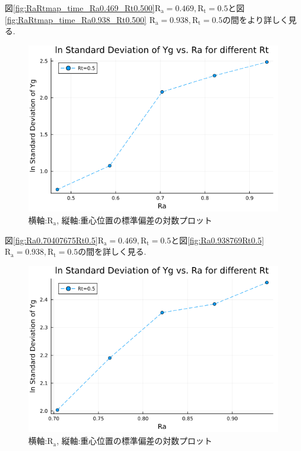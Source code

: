 \vspace{1\baselineskip}

図\ref{fig:RaRtmap_time_Ra0.469_Rt0.500}$\text{R}_\text{a} = 0.469, \text{R}_\text{t} = 0.5$と図\ref{fig:RaRtmap_time_Ra0.938_Rt0.500} $\text{R}_\text{a} = 0.938, \text{R}_\text{t} = 0.5$の間をより詳しく見る.



\begin{figure}[H]
  \centering
  \includegraphics[scale=0.5]{image/lnStdYg_Ra0.4693845to0.98769_Rt0.5_ti25000.png}
  \caption{横軸:$\text{R}_\text{a}$, 縦軸:重心位置の標準偏差の対数プロット}
  \label{}
\end{figure}

\vspace{1\baselineskip}

図\ref{fig:Ra0.70407675Rt0.5}$\text{R}_\text{a} = 0.469, \text{R}_\text{t} = 0.5$と図\ref{fig:Ra0.938769Rt0.5} $\text{R}_\text{a} = 0.938, \text{R}_\text{t} = 0.5$の間を詳しく見る. 



\begin{figure}[H]
  \centering
  \includegraphics[scale=0.5]{image/lnStdYg_Ra0.70407675to0.98769_Rt0.5_ti25000.png}
  \caption{横軸:$\text{R}_\text{a}$, 縦軸:重心位置の標準偏差の対数プロット}
  \label{}
\end{figure}

